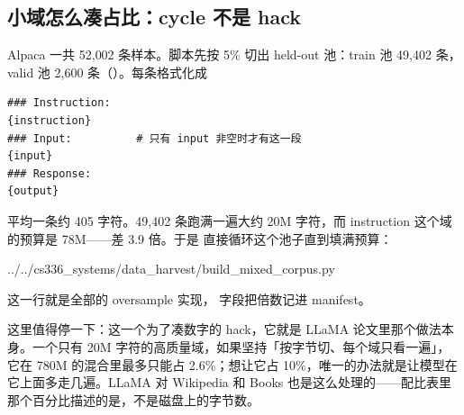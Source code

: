 \subsection{小域怎么凑占比：cycle 不是 hack}
\label{subsec:cycle}

Alpaca 一共 52{,}002 条样本。脚本先按 5\% 切出 held-out 池：train 池 49{,}402 条，valid 池 2{,}600 条（）。每条格式化成

\begin{lstlisting}[style=hlplain]
### Instruction:
{instruction}
### Input:          # 只有 input 非空时才有这一段
{input}
### Response:
{output}
\end{lstlisting}

平均一条约 405 字符。49{,}402 条跑满一遍大约 20M 字符，而 instruction 这个域的预算是 78M——差 3.9 倍。于是  直接循环这个池子直到填满预算：

%
  {../../cs336_systems/data_harvest/build_mixed_corpus.py}

 这一行就是全部的 oversample 实现， 字段把倍数记进 manifest。

这里值得停一下：这一个为了凑数字的 hack，它就是 LLaMA 论文里那个做法本身。一个只有 20M 字符的高质量域，如果坚持「按字节切、每个域只看一遍」，它在 780M 的混合里最多只能占 2.6\%；想让它占 10\%，唯一的办法就是让模型在它上面多走几遍。LLaMA 对 Wikipedia 和 Books 也是这么处理的——配比表里那个百分比描述的是，不是磁盘上的字节数。

